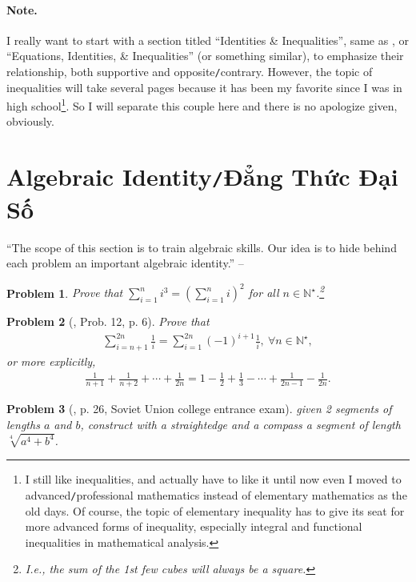 \documentclass[oneside]{book}
\numberwithin{equation}{section}
\newtheorem{problem}{Problem}[section]
\begin{document}
\paragraph{Note.} I really want to start with a section titled ``Identities \& Inequalities'', same as \cite[Sect. 2.1]{Gelca_Andreescu2017}, or ``Equations, Identities, \& Inequalities'' (or something similar), to emphasize their relationship, both supportive and opposite\texttt{/}contrary. However, the topic of inequalities will take several pages because it has been my favorite since I was in high school\footnote{I still like inequalities, and actually have to like it until now even I moved to advanced\texttt{/}professional mathematics instead of elementary mathematics as the old days. Of course, the topic of elementary inequality has to give its seat for more advanced forms of inequality, especially integral and functional inequalities in mathematical analysis.}. So I will separate this couple here and there is no apologize given, obviously.

\section{Algebraic Identity\texttt{/}Đẳng Thức Đại Số}
``The scope of this section is to train algebraic skills. Our idea is to hide behind each problem an important algebraic identity.'' -- \cite[Subsect. 2.1.1, p. 25]{Gelca_Andreescu2017}

\begin{problem}
	Prove that $\sum_{i=1}^n i^3 = \left(\sum_{i=1}^n i\right)^2$ for all $n\in\mathbb{N}^\star$.\footnote{I.e., the sum of the 1st few cubes will always be a square.}
\end{problem}

\begin{problem}[\cite{Gelca_Andreescu2017}, Prob. 12, p. 6] Prove that
	\begin{align*}
		\sum_{i=n+1}^{2n} \frac{1}{i} = \sum_{i=1}^{2n} (-1)^{i+1}\frac{1}{i},\ \forall n\in\mathbb{N}^\star,
	\end{align*}
	or more explicitly,
	\begin{align*}
		\frac{1}{n + 1} + \frac{1}{n + 2} + \cdots + \frac{1}{2n} = 1 - \frac{1}{2} + \frac{1}{3} - \cdots + \frac{1}{2n - 1} - \frac{1}{2n}.
	\end{align*}
\end{problem}

\begin{problem}[\cite{Gelca_Andreescu2017}, p. 26, Soviet Union college entrance exam]
	given 2 segments of lengths $a$ and $b$, construct with a straightedge and a compass a segment of length $\sqrt[4]{a^4 + b^4}$.
\end{problem}
\end{document}
